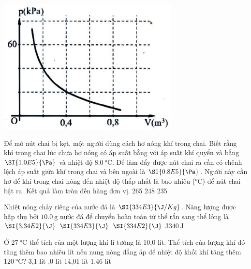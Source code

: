 \begin{ex}
	{\includegraphics[scale=0.6]{../figs/FINAL_SEM1_001_2}}
\end{ex}
\begin{ex}
	Để mở nút chai bị kẹt, một người dùng cách hơ nóng khí trong chai. Biết rằng khí trong chai lúc chưa hơ nóng có áp suất bằng với áp suất khí quyển và bằng $\SI{1.0E5}{\Pa}$ và nhiệt độ $\SI{8.0}{\celsius}$. Để làm đẩy được nút chai ra cần có chênh lệch áp suất giữa khí trong chai và bên ngoài là $\SI{0.8E5}{\Pa}$. Người này cần hơ để khí trong chai nóng đến nhiệt độ thấp nhất là bao nhiêu ($\si{\celsius}$) để nút chai bật ra. Kết quả làm tròn đến hàng đơn vị.
	\choice
	{265}
	{248}
	{}
	{235}
\end{ex}
\begin{ex}
	Nhiệt nóng chảy riêng của nước đá là $\SI{334E3}{\J/Kg}$. Năng lượng được hấp thụ bởi $\SI{10.0}{\g}$ nước đá để chuyển hoàn toàn từ thể rắn sang thể lỏng là
	\choice
	{$\SI{3.34E2}{\J}$}
	{$\SI{334E3}{\J}$}
	{$\SI{334E2}{\J}$}
	{\True $\SI{3340}{\J}$}
	\loigiai{}
\end{ex}
\begin{ex}
	Ở $\SI{27}{\celsius}$ thể tích của một lượng khí lí tưởng là 10,0 lít. Thể tích của lượng khí đó tăng thêm bao nhiêu lít nếu nung nóng đẳng áp để nhiệt độ khối khí tăng thêm $\SI{120}{\celsius}$? 
	\choice
	{3,1 lít}
	{,0 lít}
	{14,01 lít}
	{1,46 lít}
	\loigiai{}
\end{ex}
